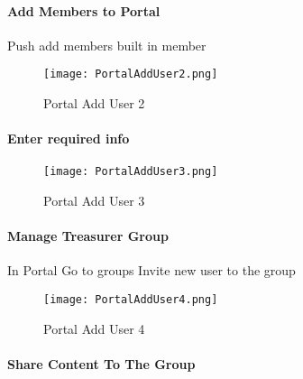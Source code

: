  \paragraph[Add Members to Portal]{\Large Add Members to Portal\texorpdfstring{\\}{}}
 \vspace{.5in}

 Push add members \rtArrow built in member
 \vspace{.5in}

 \begin{figure}[h!]
 \centering
     \texttt{[image: PortalAddUser2.png]}
 \caption{Portal Add User 2}
 \end{figure}
 \clearpage
 \paragraph[Enter required info]{\Large Enter required info\texorpdfstring{\\}{}}
 \vspace{.5in}

 \begin{figure}[h!]
 \centering
     \texttt{[image: PortalAddUser3.png]}
 \caption{Portal Add User 3}
 \end{figure}
 \clearpage
 \paragraph[Manage Treasurer Group]{\Large Manage Treasurer Group\texorpdfstring{\\}{}}
 \vspace{.5in}

 In Portal \rtArrow Go to groups \rtArrow Invite new user to the group
 \vspace{.5in}

 \begin{figure}[h!]
 \centering
     \texttt{[image: PortalAddUser4.png]}
 \caption{Portal Add User 4}
 \end{figure}
 \clearpage
 \paragraph[Share Portal Content]{\Large Share Content To The Group\texorpdfstring{\\}{}}
 \vspace{.5in}

